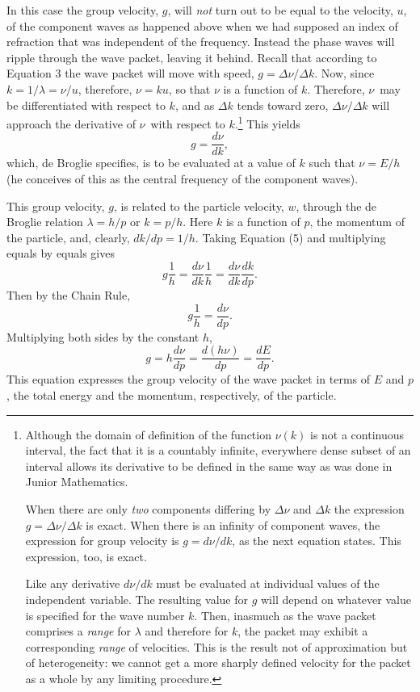 In this case the group velocity, $g$, will \emph{not} turn out to
be equal to the velocity, $u$, of the component waves as happened
above when we had supposed an index of refraction that was independent
of the frequency. Instead the phase waves will ripple through the wave
packet, leaving it behind. Recall that according to Equation 3 the wave
packet will move with speed, $g = \Delta\nu/\Delta k$. Now, since
$k = 1/\lambda = \nu/u$, therefore,
$\nu = ku$, so that $\nu$ is a function of $k$.
Therefore, $\nu$~may be differentiated with respect to $k$, and
as $\Delta k$ tends toward zero, $\Delta\nu/\Delta k$ will approach the
derivative of $\nu$~with respect to $k$.\footnote{Although the
  domain of definition of the function $\nu(k)$ is not a
  continuous interval, the fact that it is a countably infinite,
  everywhere dense subset of an interval allows its derivative to be
  defined in the same way as was done in Junior Mathematics.

  When there are only \emph{two} components differing by $\Delta\nu$ and
  $\Delta k$ the expression $g = \Delta\nu/\Delta k$ is exact. When
  there is an infinity of component waves, the expression for group
  velocity is $g = d\nu/dk$, as the next equation states. This
  expression, too, is exact.

  Like any derivative $d\nu/dk$ must be evaluated at individual
  values of the independent variable. The resulting value for $g$
  will depend on whatever value is specified for the wave number
  $k$. Then, inasmuch as the wave packet comprises a \emph{range}
  for $\lambda$ and therefore for $k$, the packet may exhibit a
  corresponding \emph{range} of velocities. This is the result not of
  approximation but of heterogeneity: we cannot get a more sharply
  defined velocity for the packet as a whole by any limiting procedure.}
This yields
\begin{equation*}\tag{5}\label{debsch}
g = \frac{d\nu}{dk} ,
\end{equation*}
which, de Broglie specifies, is to be evaluated at a value of $k$
such that $\nu = E/h$ (he conceives of this as the
central frequency of the component waves).

This group velocity, $g$, is related to the particle velocity,
$w$, through the de Broglie relation $\lambda = h/p$
or $k = p/h$. Here $k$ is a function of
$p$, the momentum of the particle, and, clearly, $dk/dp=1/h$.
Taking Equation (5) and multiplying equals by equals gives
\begin{equation*}
g\frac{1}{h} = \frac{d\nu}{dk}\frac{1}{h} = \frac{d\nu}{dk}\frac{dk}{dp}.
\end{equation*}
Then by the Chain Rule,
\begin{equation*}
g\frac{1}{h} = \frac{d\nu}{dp}.
\end{equation*}
Multiplying both sides by the constant $h$,
\begin{equation*}
g = h\frac{d\nu}{dp} = \frac{d(h\nu)}{dp} = \frac{dE}{dp}.
\end{equation*}
This equation expresses the group velocity of the wave packet in terms
of $E$ and $p$, the total energy and the momentum,
respectively, of the particle.

